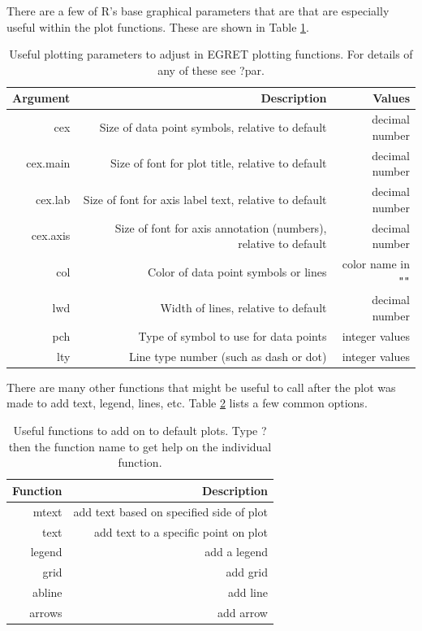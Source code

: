 \documentclass[a4paper,11pt]{article}\usepackage[]{graphicx}\usepackage[]{color}
\begin{document}
There are a few of R's base graphical parameters that are that are especially useful within the plot functions. These are shown in Table \ref{table:tableChangeSingle}.

\begin{table}[ht]
\centering
\begin{tabular}{rrr}
  \hline
Argument & Description & Values  \\ 
  \hline
cex &  Size of data point symbols, relative to default & decimal number \\ 
cex.main & Size of font for plot title, relative to default & decimal number \\ 
cex.lab &  Size of font for axis label text, relative to default & decimal number \\ 
cex.axis & Size of font for axis annotation (numbers), relative to default & decimal number\\
col & Color of data point symbols or lines & color name in \texttt{"}\texttt{"} \\
lwd & Width of lines, relative to default & decimal number\\
pch & Type of symbol to use for data points & integer values\\
lty & Line type number (such as dash or dot) & integer values\\
   \hline
\end{tabular}
\caption{Useful plotting parameters to adjust in EGRET plotting functions.  For details of any of these see ?par.} 
\label{table:tableChangeSingle}
\end{table}

There are many other functions that might be useful to call after the plot was made to add text, legend, lines, etc. Table \ref{table:addOns} lists a few common options.

\begin{table}[ht]
\centering
\begin{tabular}{rr}
  \hline
Function & Description  \\ 
  \hline
mtext & add text based on specified side of plot\\
text & add text to a specific point on plot\\
legend & add a legend \\ 
grid & add grid\\ 
abline & add line \\
arrows & add arrow \\ 
   \hline
\end{tabular}
\caption{Useful functions to add on to default plots. Type ? then the function name to get help on the individual function.} 
\label{table:addOns}
\end{table}
\end{document}
